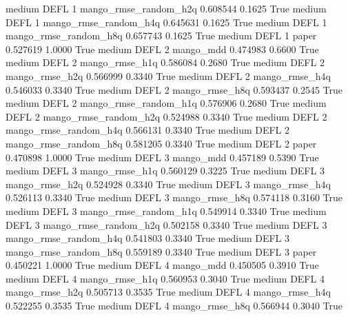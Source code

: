    medium     DEFL                 1 mango_rmse_random_h2q   0.608544      0.1625    True
    medium     DEFL                 1 mango_rmse_random_h4q   0.645631      0.1625    True
    medium     DEFL                 1 mango_rmse_random_h8q   0.657743      0.1625    True
    medium     DEFL                 1                 paper   0.527619      1.0000    True
    medium     DEFL                 2             mango_mdd   0.474983      0.6600    True
    medium     DEFL                 2        mango_rmse_h1q   0.586084      0.2680    True
    medium     DEFL                 2        mango_rmse_h2q   0.566999      0.3340    True
    medium     DEFL                 2        mango_rmse_h4q   0.546033      0.3340    True
    medium     DEFL                 2        mango_rmse_h8q   0.593437      0.2545    True
    medium     DEFL                 2 mango_rmse_random_h1q   0.576906      0.2680    True
    medium     DEFL                 2 mango_rmse_random_h2q   0.524988      0.3340    True
    medium     DEFL                 2 mango_rmse_random_h4q   0.566131      0.3340    True
    medium     DEFL                 2 mango_rmse_random_h8q   0.581205      0.3340    True
    medium     DEFL                 2                 paper   0.470898      1.0000    True
    medium     DEFL                 3             mango_mdd   0.457189      0.5390    True
    medium     DEFL                 3        mango_rmse_h1q   0.560129      0.3225    True
    medium     DEFL                 3        mango_rmse_h2q   0.524928      0.3340    True
    medium     DEFL                 3        mango_rmse_h4q   0.526113      0.3340    True
    medium     DEFL                 3        mango_rmse_h8q   0.574118      0.3160    True
    medium     DEFL                 3 mango_rmse_random_h1q   0.549914      0.3340    True
    medium     DEFL                 3 mango_rmse_random_h2q   0.502158      0.3340    True
    medium     DEFL                 3 mango_rmse_random_h4q   0.541803      0.3340    True
    medium     DEFL                 3 mango_rmse_random_h8q   0.559189      0.3340    True
    medium     DEFL                 3                 paper   0.450221      1.0000    True
    medium     DEFL                 4             mango_mdd   0.450505      0.3910    True
    medium     DEFL                 4        mango_rmse_h1q   0.560953      0.3040    True
    medium     DEFL                 4        mango_rmse_h2q   0.505713      0.3535    True
    medium     DEFL                 4        mango_rmse_h4q   0.522255      0.3535    True
    medium     DEFL                 4        mango_rmse_h8q   0.566944      0.3040    True
